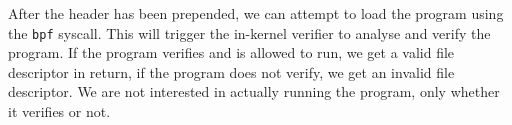   
  After the header has been prepended, we can attempt to load the program using the \texttt{bpf} syscall. This will trigger the in-kernel verifier to analyse and verify the program. If the program verifies and is allowed to run, we get a valid file descriptor in return, if the program does not verify, we get an invalid file descriptor.
  We are not interested in actually running the program, only whether it verifies or not.
  

